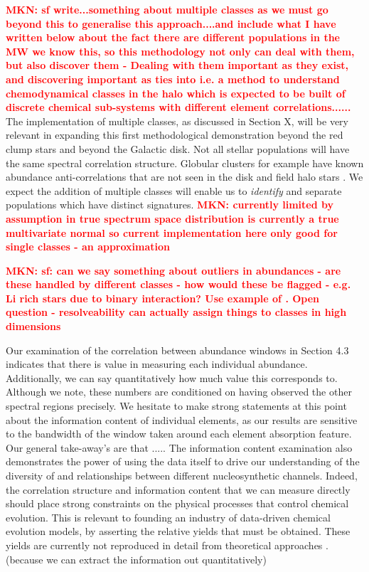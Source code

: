 \documentclass[a4paper,fleqn,usenatbib]{mnras}
\newcommand{\mkn}[1]{\textbf{\textcolor{red}{MKN: #1}}}
\begin{document}
\mkn{ sf write...something about multiple classes as we must go beyond this to generalise this approach....and include what I have written below about the fact there are different populations in the MW we know this, so this methodology not only can deal with them, but also discover them -  Dealing with them important as they exist, and discovering important as ties into i.e. a method to understand chemodynamical classes in the halo which is expected to be built of discrete chemical sub-systems with different element correlations......} The implementation of multiple classes, as discussed in Section X, will be very relevant in expanding this first methodological demonstration beyond the red clump stars and beyond the Galactic disk. Not all stellar populations will have the same spectral correlation structure. Globular clusters for example have known abundance anti-correlations that are not seen in the disk and field halo stars \citep{}. We expect the addition of multiple classes will enable us to {\it identify} and separate populations which have distinct signatures. \mkn{currently limited by assumption in true spectrum space distribution is currently a true multivariate normal so current implementation here only good for single classes - an approximation} 
 
 \mkn{ sf: can we say something about outliers in abundances - are these handled by different classes - how would these be flagged - e.g. Li rich stars due to binary interaction? Use example of \citep{Casey2019}. Open question - resolveability can actually assign things to classes in high dimensions} 
 
 Our examination of the correlation between abundance windows in Section 4.3 indicates that there is value in measuring each individual abundance. Additionally, we can say quantitatively how much value this corresponds to. Although we note, these numbers are conditioned on having observed the other spectral regions precisely. We hesitate to make strong statements at this point about the information content of individual elements, as our results are sensitive to the bandwidth of the window taken around each element absorption feature. Our general take-away's are that ..... The information content examination also demonstrates the power of using the data itself to drive our understanding of the diversity of and relationships between different nucleosynthetic channels. Indeed, the correlation structure and information content that we can measure directly should place strong constraints on the physical processes that control chemical evolution. This is relevant to founding an industry of data-driven chemical evolution models, by asserting the relative yields that must be obtained. These yields are currently not reproduced in detail from theoretical approaches \citep[e.g.][and Blancato, submitted, 2019]{Jan2017}. (because we can extract the information out quantitatively) 
 
\end{document}
